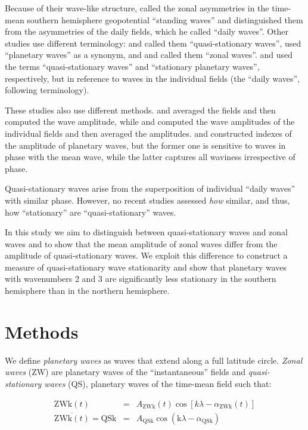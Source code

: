 \documentclass[draft,linenumbers]{agujournal2018}
\begin{document}
Because of their wave-like structure, \citet{Loon1972} called the zonal
asymmetries in the time-mean southern hemisphere geopotential ``standing
waves'' and distinguished them from the asymmetries of the daily fields,
which he called ``daily waves''. Other studies use different
terminology: \citet{Quintanar1995a} and \citet{Rao2004} called them
``quasi-stationary waves'', \citet{Turner2017} used ``planetary waves''
as a synonym, and \citet{Raphael2004} and \citet{Irving2015} called them
``zonal waves''. \citet{Kravchenko2012} and \citet{Lastovicka2018} used
the terms ``quasi-stationary waves'' and ``stationary planetary waves'',
respectively, but in reference to waves in the individual fields (the
``daily waves'', following \citet{Loon1972} terminology).

These studies also use different methods. \citet{Loon1972} and
\citet{Quintanar1995a} averaged the fields and then computed the wave
amplitude, while \citet{Rao2004} and \citet{Turner2017} computed the
wave amplitudes of the individual fields and then averaged the
amplitudes. \citet{Raphael2004} and \citet{Irving2015} constructed
indexes of the amplitude of planetary waves, but the former one is
sensitive to waves in phase with the mean wave, while the latter
captures all waviness irrespective of phase.

Quasi-stationary waves arise from the superposition of individual
``daily waves'' with similar phase. However, no recent studies assessed
\emph{how} similar, and thus, how ``stationary'' are
``quasi-stationary'' waves.

In this study we aim to distinguish between quasi-stationary waves and
zonal waves and to show that the mean amplitude of zonal waves differ
from the amplitude of quasi-stationary waves. We exploit this difference
to construct a measure of quasi-stationary wave stationarity and show
that planetary waves with wavenumbers 2 and 3 are significantly less
stationary in the southern hemisphere than in the northern hemisphere.

\section{Methods}

We define \emph{planetary waves} as waves that extend along a full
latitude circle. \emph{Zonal waves} (ZW) are planetary waves of the
``instantaneous'' fields and \emph{quasi-stationary waves} (QS),
planetary waves of the time-mean field such that:

\begin{linenomath*}
\begin{eqnarray}\label{eq:ZW}
\mathrm{ZWk}(t) & = & A_\mathrm{ZWk}(t)\cos \left [ k\lambda - \alpha_\mathrm{ZWk}(t) \right ] \\ 
\overline{\mathrm{ZWk}(t)} = \mathrm{QSk} & = & A_\mathrm{QSk}\cos \left (  \mathrm{k}\lambda - \alpha_\mathrm{QSk} \right ) \label{eq:QS}
\end{eqnarray}
\end{linenomath*}
\end{document}
